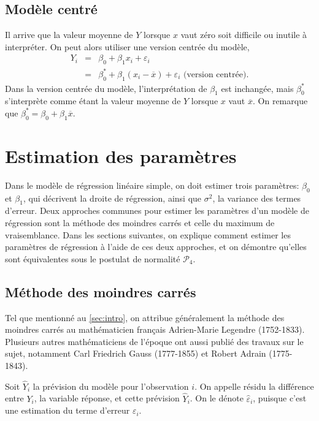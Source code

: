 \subsection*{Modèle centré}

Il arrive que la valeur moyenne de $Y$ lorsque $x$ vaut zéro soit difficile ou inutile à interpréter. On peut alors utiliser une version centrée du modèle,
\begin{eqnarray*}
 Y_i &=& \beta_0 + \beta_1 x_i + \varepsilon_i \\
 &=& \beta_0^* + \beta_1 (x_i - \overline{x}) + \varepsilon_i \text{ (version centrée)}.
\end{eqnarray*}
Dans la version centrée du modèle, l'interprétation de $\beta_1$ est inchangée, mais $\beta_0^*$ s'interprète comme étant la valeur moyenne de $Y$ lorsque $x$ vaut $\overline{x}$. On remarque que $\beta_0^* = \beta_0 + \beta_1 \overline{x}$.


\section{Estimation des paramètres}
\label{sec:estimation}

Dans le modèle de régression linéaire simple, on doit estimer trois paramètres: $\beta_0$ et $\beta_1$, qui décrivent la droite de régression, ainsi que $\sigma^2$, la variance des termes d'erreur. Deux approches communes pour estimer les paramètres d'un modèle de régression sont la méthode des moindres carrés et celle du maximum de vraisemblance. Dans les sections suivantes, on explique comment estimer les paramètres de régression à l'aide de ces deux approches, et on démontre qu'elles sont équivalentes sous le postulat de normalité $\mathcal{P}_4$.

\subsection{Méthode des moindres carrés}

Tel que mentionné au \autoref{sec:intro}, on attribue généralement la méthode des moindres carrés au mathématicien français Adrien-Marie Legendre (1752-1833). Plusieurs autres mathématiciens de l'époque ont aussi publié des travaux sur le sujet, notamment Carl Friedrich Gauss (1777-1855) et Robert Adrain (1775-1843).

Soit $\widehat{Y}_i$ la prévision du modèle pour l'observation $i$. On appelle résidu la différence entre $Y_i$, la variable réponse, et cette prévision $\widehat{Y}_i$. On le dénote $\widehat{\varepsilon}_i$, puisque c'est une estimation du terme d'erreur $\varepsilon_i$.

